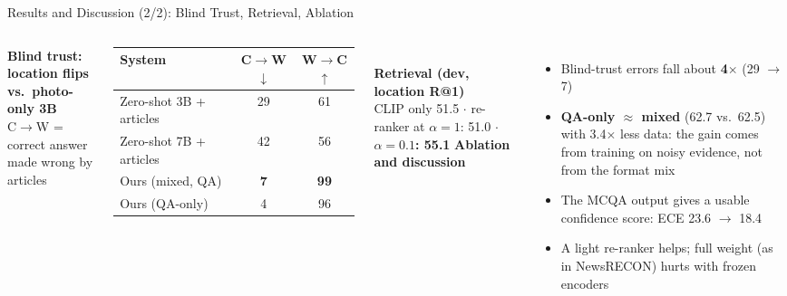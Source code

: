 \documentclass[aspectratio=169,10pt]{beamer}
\begin{document}
\begin{frame}{Results and Discussion (2/2): Blind Trust, Retrieval, Ablation}
\begin{columns}[T]
\small
\textbf{Blind trust: location flips vs.\ photo-only 3B}\\
{\scriptsize C$\to$W = correct answer made wrong by articles}\\[0.3em]
\begin{tabular}{@{}lcc@{}}
\toprule
System & C$\to$W$\downarrow$ & W$\to$C$\uparrow$ \\
\midrule
Zero-shot 3B + articles & 29 & 61 \\
Zero-shot 7B + articles & 42 & 56 \\
\alert{Ours (mixed, QA)} & \alert{\textbf{7}} & \alert{\textbf{99}} \\
Ours (QA-only) & 4 & 96 \\
\bottomrule
\end{tabular}\\[0.6em]
\textbf{Retrieval (dev, location R@1)}\\[0.2em]
CLIP only 51.5 $\cdot$ re-ranker at $\alpha{=}1$: 51.0 $\cdot$ \textbf{$\alpha{=}0.1$: 55.1}
\small
\textbf{Ablation and discussion}
\begin{itemize}
\item Blind-trust errors fall about \textbf{4$\times$} (29 $\rightarrow$ 7)
\item \textbf{QA-only $\approx$ mixed} (62.7 vs.\ 62.5) with 3.4$\times$ less data: the gain comes from training on \alert{noisy evidence}, not from the format mix
\item The MCQA output gives a usable confidence score: ECE 23.6 $\rightarrow$ 18.4
\item A light re-ranker helps; full weight (as in NewsRECON) hurts with frozen encoders
\end{itemize}
\end{columns}
\end{frame}
\end{document}
